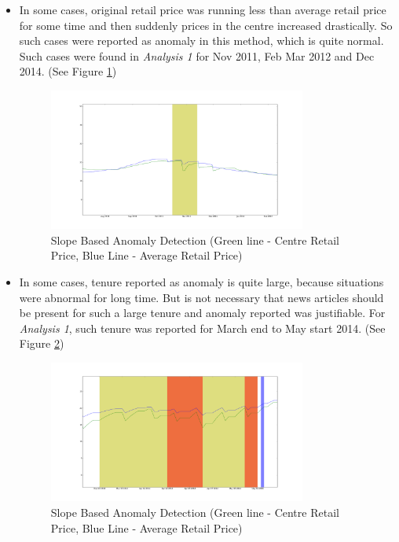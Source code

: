 \documentclass[a4paper,10pt]{report}
\begin{document}
\begin{itemize}
			\item In some cases, original retail price was running less than average retail price for some time and then suddenly prices in the centre increased drastically. So such cases were reported as anomaly in this method, which is quite normal. Such cases were found in \textit{Analysis 1} for Nov 2011, Feb Mar 2012 and Dec 2014. (See Figure \ref{fig:12114})
			
			\begin{figure}[H]
		    	\centering
  		    	\includegraphics[width=0.8\textwidth]{graphs/12114.png}
		    	\caption{Slope Based Anomaly Detection (Green line - Centre Retail Price, Blue Line - Average Retail Price)}
		    	\label{fig:12114}
			\end{figure}			
			
			\item In some cases, tenure reported as anomaly is quite large, because situations were abnormal for long time. But is not necessary that news articles should be present for such a large tenure and anomaly reported was justifiable. For\textit{ Analysis 1}, such tenure was reported for March end to May start 2014.  (See Figure \ref{fig:12115})
			
			\begin{figure}[H]
		    	\centering
  		    	\includegraphics[width=0.8\textwidth]{graphs/12115.png}
		    	\caption{Slope Based Anomaly Detection (Green line - Centre Retail Price, Blue Line - Average Retail Price)}
		    	\label{fig:12115}
			\end{figure}			
			

\end{itemize}
\end{document}
